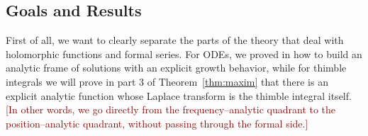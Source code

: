 \documentclass{article}
\newcommand{\laplace}{\mathcal{L}}
\newcommand{\borel}{\mathcal{B}}
\theoremstyle{definition}
\theoremstyle{plain}
\begin{document}



\subsection{Goals and Results}

First of all, we want to clearly separate the parts of the theory that deal with holomorphic functions and formal series. For ODEs, we proved in \cite[Theorem~4]{reg-sing-volterra} how to build an analytic frame of solutions with an explicit growth behavior, while for thimble integrals we will prove in part 3 of Theorem~\ref{thm:maxim} that there is an explicit analytic function whose Laplace transform is the thimble integral itself. \textcolor{Maroon}{[In other words, we go directly from the frequency--analytic quadrant to the position--analytic quadrant, without passing through the formal side.]}
\end{document}
